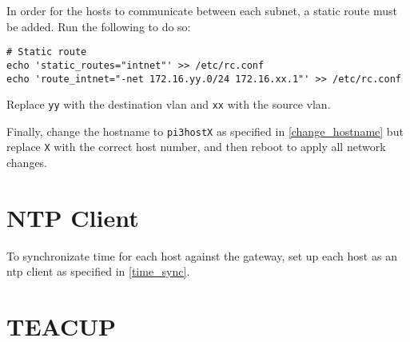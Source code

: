 In order for the hosts to communicate between each subnet, a static route must be added. Run the following to do so:

\begin{lstlisting}
# Static route
echo 'static_routes="intnet"' >> /etc/rc.conf
echo 'route_intnet="-net 172.16.yy.0/24 172.16.xx.1"' >> /etc/rc.conf
\end{lstlisting}

Replace \lstinline{yy} with the destination \gls{vlan} and \lstinline{xx} with the source \gls{vlan}.

Finally, change the hostname to \lstinline{pi3hostX} as specified in \ref{change_hostname} but replace \lstinline{X} with the correct host number, and then reboot to apply all network changes.


\section{NTP Client}

To synchronizate time for each host against the gateway, set up each host as an \gls{ntp} client as specified in \ref{time_sync}.


\section{TEACUP}

